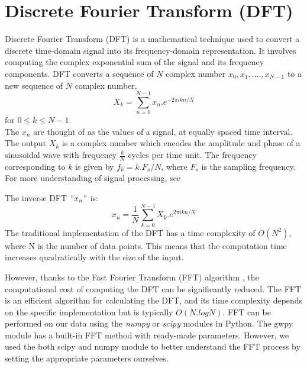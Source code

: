 \section{ Discrete Fourier Transform (DFT)}
 Discrete Fourier Transform (DFT)
 is a mathematical technique used to convert a discrete time-domain signal into its frequency-domain representation. It involves computing the complex exponential sum of the signal and its frequency components. DFT converts a sequence of $N$ complex number
 $x_{0},x_{1},....,x_{N-1}$ to a new sequence of $N$ complex number,
 \begin{equation}
     X_{k} = \sum_{n=0}^{N-1} x_{n}.e^{-2\pi ikn/N}
 \end{equation}
 for $0\leq k\leq N-1$.\\
 The $x_{n}$ are thought of as the values of a signal, at equally spaced time interval. The output $X_{k}$ is a complex number which encodes the amplitude and phase of a sinusoidal wave with frequency $\frac{k}{N}$ cycles per time unit. The frequency corresponding to  $k$ is given by $f_{k} = k.F_{s}/N$, where $F_{s}$ is the sampling frequency. For more understanding of signal processing, see \cite{lyons2004understanding}\citep{proakis2007digital} 
 
The inverse DFT $"x_{n}"$ is:
\begin{equation}
    x_{n} = \frac{1}{N} \sum_{k=0}^{N-1} X_{k}.e^{2\pi ikn/N}
\end{equation}
The traditional implementation of the DFT has a time complexity of $O(N^2)$, where N is the number of data points. This means that the computation time increases quadratically with the size of the input.

However, thanks to the Fast Fourier Transform (FFT) algorithm \cite{cooley1965algorithm}, the computational cost of computing the DFT can be significantly reduced. The FFT is an efficient algorithm for calculating the DFT, and its time complexity depends on the specific implementation but is typically $O(N.log N)$. 
FFT can be performed on our data using the \textit{numpy} or \textit{scipy} modules in Python. The gwpy module \cite{gwpy} has a built-in FFT method with ready-made parameters. However, we used the both scipy and numpy module to better understand the FFT process by setting the appropriate parameters ourselves.

